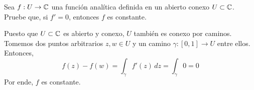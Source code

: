 \begin{exercise}
Sea $f : U \to \mathbb C$ una función analítica definida en un abierto conexo $U \subset \mathbb C$. Pruebe que, si $f' = 0$, entonces $f$ es constante.
\end{exercise}

\begin{solution}
Puesto que $U \subset \mathbb C$ es abierto y conexo, $U$ también es conexo por caminos. Tomemos dos puntos arbitrarios $z, w \in U$ y un camino $\gamma : [0,1] \to U$ entre ellos. Entonces,
$$f(z) - f(w) = \int_\gamma f'(z) \, dz = \int_\gamma 0 = 0$$
Por ende, $f$ es constante.
\end{solution}
